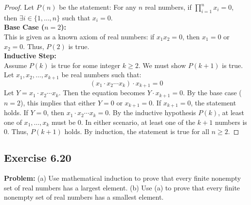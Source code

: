 \documentclass[11pt, a4paper]{article}
\theoremstyle{definition}
\theoremstyle{remark}
\begin{document}
\begin{proof}
Let $P(n)$ be the statement: For any $n$ real numbers, if $\prod_{i=1}^n x_i = 0$, then $\exists i \in \{1, \dots, n\}$ such that $x_i = 0$.
\vspace{4pt} \\
\textbf{Base Case ($n = 2$):} \\
This is given as a known axiom of real numbers: if $x_1 x_2 = 0$, then $x_1 = 0$ or $x_2 = 0$. Thus, $P(2)$ is true.
\vspace{4pt} \\
\textbf{Inductive Step:} \\
Assume $P(k)$ is true for some integer $k \ge 2$. We must show $P(k+1)$ is true. Let $x_1, x_2, \dots, x_{k+1}$ be real numbers such that:
\[ (x_1 \cdot x_2 \cdots x_k) \cdot x_{k+1} = 0 \]
Let $Y = x_1 \cdot x_2 \cdots x_k$. Then the equation becomes $Y \cdot x_{k+1} = 0$. By the base case ($n=2$), this implies that either $Y = 0$ or $x_{k+1} = 0$.
If $x_{k+1} = 0$, the statement holds. 
If $Y = 0$, then $x_1 \cdot x_2 \cdots x_k = 0$. By the inductive hypothesis $P(k)$, at least one of $x_1, \dots, x_k$ must be $0$. 
In either scenario, at least one of the $k+1$ numbers is $0$. Thus, $P(k+1)$ holds. By induction, the statement is true for all $n \ge 2$.
\end{proof}

\subsection{Exercise 6.20}
\textbf{Problem:} (a) Use mathematical induction to prove that every finite nonempty set of real numbers has a largest element. (b) Use (a) to prove that every finite nonempty set of real numbers has a smallest element.
\end{document}

